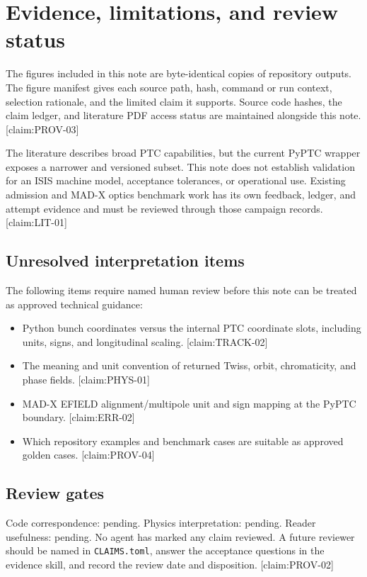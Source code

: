 \section{Evidence, limitations, and review status}
\label{sec:evidence}

The figures included in this note are byte-identical copies of repository outputs. The figure manifest gives each source path, hash, command or run context, selection rationale, and the limited claim it supports. Source code hashes, the claim ledger, and literature PDF access status are maintained alongside this note. [claim:PROV-03]

The literature describes broad PTC capabilities, but the current PyPTC wrapper exposes a narrower and versioned subset. This note does not establish validation for an ISIS machine model, acceptance tolerances, or operational use. Existing admission and MAD-X optics benchmark work has its own feedback, ledger, and attempt evidence and must be reviewed through those campaign records. [claim:LIT-01]

\subsection{Unresolved interpretation items}

The following items require named human review before this note can be treated as approved technical guidance:
\begin{itemize}
  \item Python bunch coordinates versus the internal PTC coordinate slots, including units, signs, and longitudinal scaling. [claim:TRACK-02]
  \item The meaning and unit convention of returned Twiss, orbit, chromaticity, and phase fields. [claim:PHYS-01]
  \item MAD-X EFIELD alignment/multipole unit and sign mapping at the PyPTC boundary. [claim:ERR-02]
  \item Which repository examples and benchmark cases are suitable as approved golden cases. [claim:PROV-04]
\end{itemize}

\subsection{Review gates}

Code correspondence: pending. Physics interpretation: pending. Reader usefulness: pending. No agent has marked any claim reviewed. A future reviewer should be named in \texttt{CLAIMS.toml}, answer the acceptance questions in the evidence skill, and record the review date and disposition. [claim:PROV-02]

